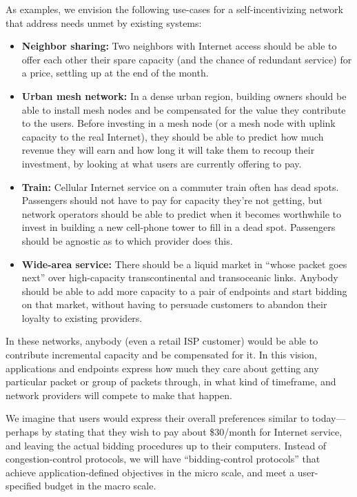 As examples, we envision the following use-cases for a
self-incentivizing network that address needs unmet by existing systems:

\begin{itemize}
\item \textbf{Neighbor sharing:} Two neighbors with Internet access
  should be able to offer each other their spare capacity (and the
  chance of redundant service) for a price, settling up at the end of
  the month.

\item \textbf{Urban mesh network:} In a dense urban region, building
  owners should be able to install mesh nodes and be compensated for
  the value they contribute to the users. Before investing in a mesh
  node (or a mesh node with uplink capacity to the real Internet),
  they should be able to predict how much revenue they will earn and
  how long it will take them to recoup their investment, by looking at
  what users are currently offering to pay.

\item \textbf{Train:} Cellular Internet service on a commuter train
  often has dead spots. Passengers should not have to pay for capacity
  they're not getting, but network operators should be able to
  predict when it becomes worthwhile to invest in building a new
  cell-phone tower to fill in a dead spot. Passengers should be
  agnostic as to which provider does this.

\item \textbf{Wide-area service:} There should be a liquid market in
  ``whose packet goes next'' over high-capacity
  transcontinental and transoceanic links. Anybody should be able to
  add more capacity to a pair of endpoints and start bidding on that
  market, without having to persuade customers to abandon their
  loyalty to existing providers.

\end{itemize}

In these networks, anybody (even a retail ISP customer) would be able
to contribute incremental capacity and be compensated for it. In this
vision, applications and endpoints express how much they care about
getting any particular packet or group of packets through, in what
kind of timeframe, and network providers will compete to make that
happen.

We imagine that users would express their overall preferences similar
to today---perhaps by stating that they wish to pay about \$30/month
for Internet service, and leaving the actual bidding procedures up to
their computers. Instead of congestion-control protocols, we will have
``bidding-control protocols'' that achieve application-defined objectives in the
micro scale, and meet a user-specified budget in the macro scale.

